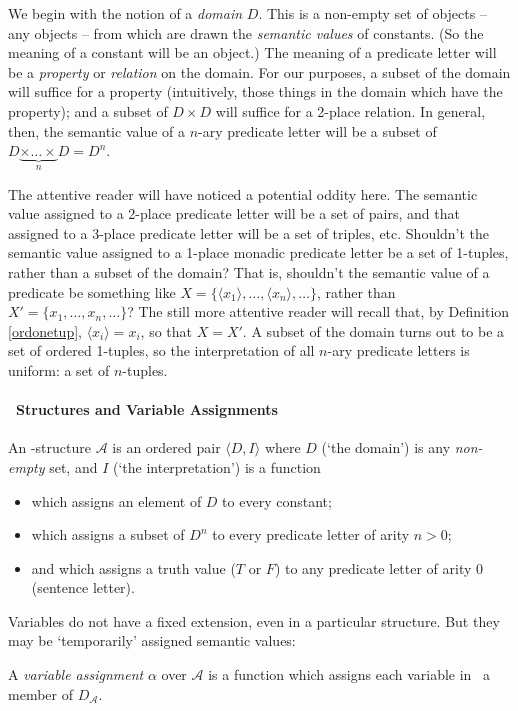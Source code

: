  We begin with the notion of a \emph{domain} $D$. This is a non-empty set of objects – any objects – from which are drawn the \emph{semantic values} of constants. (So the meaning of a constant will be an object.) The meaning of a predicate letter will be a \emph{property} or \emph{relation} on the domain. For our purposes, a subset of the domain will suffice for a property (intuitively, those  things in the domain which have the property); and a subset of $D\times D$ will suffice for a 2-place relation. In general, then, the semantic value of a $n$-ary predicate letter will be a subset of $D\underbrace{\times\ldots\times}_{n} D = D^{n}$.

 The attentive reader will have noticed a potential oddity here. The semantic value assigned to a 2-place predicate letter will be a set of pairs, and that assigned to a 3-place predicate letter will be a set of triples, etc. Shouldn't the semantic value assigned to a 1-place monadic predicate letter be a set of 1-tuples, rather than a subset of the domain? That is, shouldn't the semantic value of a predicate be something like $X=\{\langle x_{1} \rangle,…,\langle x_{n}\rangle,…\}$, rather than $X'=\{x_{1},…,x_{n},…\}$? The still more attentive reader will recall that, by Definition \ref{ordonetup}, $\langle x_{i}\rangle = x_{i}$, so that $X=X'$. A subset of the domain turns out to be a set of ordered 1-tuples, so the interpretation of all $n$-ary predicate letters is uniform: a set of $n$-tuples.


\paragraph{\ltwo\ Structures and Variable Assignments}

\begin{definition}
	An \ltwo-structure $\mathscr{A}$ is an ordered pair $\langle D, I\rangle$ where $D$ (`the domain') is any \emph{non-empty} set, and $I$ (`the interpretation') is a function \begin{itemize}
		\item which assigns an element of $D$ to every constant;
		\item which assigns a subset of $D^{n}$ to every predicate letter of arity $n>0$;
		\item and which assigns a truth value ($T$ or $F$) to any predicate letter of arity $0$ (sentence letter).
	\end{itemize}
\end{definition} Variables do not have a fixed extension, even in a particular structure. But they may be `temporarily' assigned semantic values: \begin{definition} A \emph{variable assignment} $\alpha$ over $\mathscr{A}$ is a function which assigns each variable in \ltwo\ a member of $D_{\!\mathscr{A}}$.
	\end{definition}


